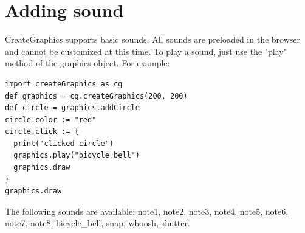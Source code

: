 \documentclass{article}
\begin{document}
\section{Adding sound}
CreateGraphics supports basic sounds. All sounds are preloaded in the browser and cannot be customized at this time.
To play a sound, just use the "play" method of the graphics object. For example:
\begin{lstlisting}
import createGraphics as cg
def graphics = cg.createGraphics(200, 200)
def circle = graphics.addCircle
circle.color := "red"
circle.click := { 
  print("clicked circle") 
  graphics.play("bicycle_bell")
  graphics.draw
}
graphics.draw
\end{lstlisting}


The following sounds are available: note1, note2, note3, note4, note5, note6, note7, note8, bicycle\_bell, snap, 
whoosh, shutter.
\end{document}
